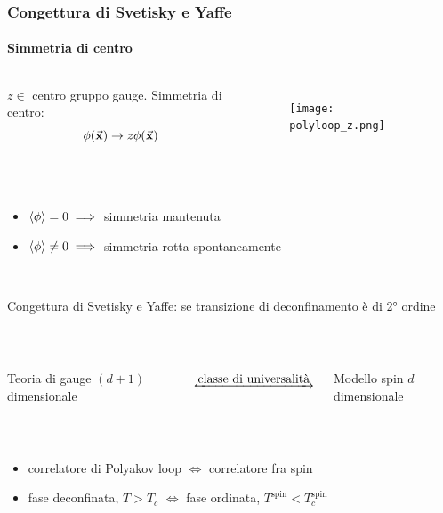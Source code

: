 \documentclass{beamer}
\begin{document}
\begin{frame}
	\frametitle{Congettura di Svetisky e Yaffe}
	\framesubtitle{Simmetria di centro}

	\begin{columns}
			$z \in$ centro gruppo gauge. Simmetria di centro:
			\begin{equation*}
				\phi(\va{x}) \rightarrow z \phi(\va{x})
			\end{equation*}

			\begin{figure}[h]
				\centering
				\texttt{[image: polyloop\_z.png]}
			\end{figure}

	\end{columns}

	\

	\begin{itemize}
		\item $\expval{\phi} = 0 \implies$ simmetria mantenuta
		\item $\expval{\phi} \ne 0 \implies$ simmetria rotta spontaneamente
	\end{itemize}

	\

	\alert{Congettura di Svetisky e Yaffe}: se transizione di deconfinamento è di 2° ordine

	\

	\begin{columns}
		\column{0.35\textwidth}
			\centering
			Teoria di gauge $(d+1)$ dimensionale 

		\column{0.3\textwidth}
			\centering
			$\underleftrightarrow{\text{ classe di universalità }}$

		\column{0.35\textwidth}
			\centering
			Modello spin $d$ dimensionale

	\end{columns}

	\

	\begin{itemize}
		\item correlatore di Polyakov loop $\iff$ correlatore fra spin 
		\item fase deconfinata, $T > T_c$ $\iff$ fase ordinata, $T^{\text{spin}} < T_c^{\text{spin}}$
	\end{itemize}


\end{frame}
\end{document}
